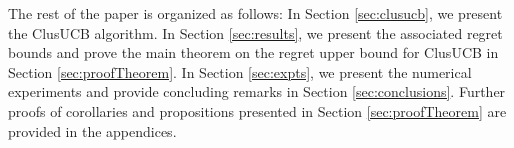 	
The rest of the paper is organized as follows: In Section \ref{sec:clusucb}, we present the ClusUCB algorithm. In Section \ref{sec:results}, we present the associated regret bounds and prove the main theorem on the regret upper bound  for ClusUCB in Section \ref{sec:proofTheorem}. In Section \ref{sec:expts}, we present the numerical experiments and provide concluding remarks in Section \ref{sec:conclusions}. Further proofs of corollaries and propositions presented in Section \ref{sec:proofTheorem} are provided in the appendices. 

